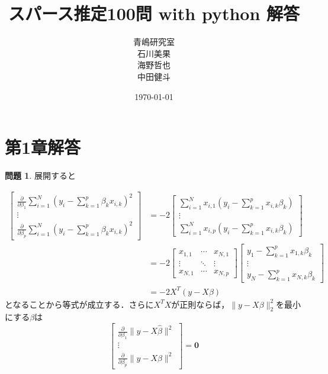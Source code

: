 \documentclass[titlepage]{jsarticle}
\title{スパース推定100問 with python 解答}
\author{青嶋研究室\\
石川美果\\
海野哲也\\
中田健斗\\}
\date{\today}
\theoremstyle{definition}
\newtheorem{Ex}{問題}
\theoremstyle{mystyle} %
\begin{document}
\large
\maketitle
\newpage
\tableofcontents


\newpage
\section{第1章解答}
\begin{Ex}
展開すると

\begin{equation}
\begin{split}
\label{ichi}
\begin{bmatrix}
\displaystyle\frac{\partial}{\partial \beta_1}\sum_{i=1}^N\left(y_i-\sum_{k=1}^p\beta_kx_{i,k}\right)^2\\
\vdots\\
\displaystyle\frac{\partial}{\partial \beta_p}\sum_{i=1}^N\left(y_i-\sum_{k=1}^p\beta_kx_{i,k}\right)^2
\end{bmatrix}&=-2\begin{bmatrix}
\displaystyle\sum_{i=1}^N x_{i,1}\left(y_i-\sum_{k=1}^p x_{i,k}\beta_k\right)\\
\vdots\\
\displaystyle\sum_{i=1}^N x_{i,p}\left(y_i-\sum_{k=1}^p x_{i,k}\beta_k\right)
\end{bmatrix}\\
&=-2\begin{bmatrix}
x_{1,1}& \cdots & x_{N,1}\\
\vdots & \ddots & \vdots\\
x_{N,1} & \cdots & x_{N,p}
\end{bmatrix}\begin{bmatrix}
y_1-\sum_{k=1}^p x_{1,k}\beta_k\\
\vdots\\
y_N-\sum_{k=1}^p x_{N,k}\beta_k
\end{bmatrix}\\
&=-2X^T(y-X\beta)
\end{split}
\end{equation}
となることから等式が成立する．さらに$X^T X$が正則ならば，$\|y-X\beta\|_2^2$を最小にする$\beta$は
$$\begin{bmatrix}
\frac{\partial}{\partial \beta_1}\|y-X\hat{\beta}\|^2\\
\vdots\\
\frac{\partial}{\partial \beta_p}\|y-X\hat{\beta}\|^2
\end{bmatrix} = {\bm 0}$$

\end{Ex}
\end{document}
